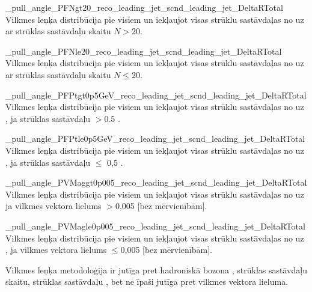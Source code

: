           {_pull_angle_PFNgt20_reco_leading_jet_scnd_leading_jet_DeltaRTotal}
          {Vilkmes leņķa distribūcija pie visiem \DeltaR un iekļaujot visas strūklu sastāvdaļas no \leadingjet uz \scndleadingjet ar strūklas sastāvdaļu skaitu $N>20$.}

          {_pull_angle_PFNle20_reco_leading_jet_scnd_leading_jet_DeltaRTotal}
          {Vilkmes leņķa distribūcija pie visiem \DeltaR un iekļaujot visas strūklu sastāvdaļas no \leadingjet uz \scndleadingjet ar strūklas sastāvdaļu skaitu $N\leq20$.}

          {_pull_angle_PFPtgt0p5GeV_reco_leading_jet_scnd_leading_jet_DeltaRTotal}
          {Vilkmes leņķa distribūcija pie visiem \DeltaR un iekļaujot visas strūklu sastāvdaļas no \leadingjet uz \scndleadingjet, ja strūklas sastāvdaļu \pt$>$0.5 \GeV.}

          {_pull_angle_PFPtle0p5GeV_reco_leading_jet_scnd_leading_jet_DeltaRTotal}
          {Vilkmes leņķa distribūcija pie visiem \DeltaR un iekļaujot visas strūklu sastāvdaļas no \leadingjet uz \scndleadingjet, ja strūklas sastāvdaļu \pt $\leq$ 0,5 \GeV.}

          {_pull_angle_PVMaggt0p005_reco_leading_jet_scnd_leading_jet_DeltaRTotal}
          {Vilkmes leņķa distribūcija pie visiem \DeltaR un iekļaujot visas strūklu sastāvdaļas no \leadingjet uz \scndleadingjet ja vilkmes vektora lielums $> $0,005 [bez mērvienībām].}

          {_pull_angle_PVMagle0p005_reco_leading_jet_scnd_leading_jet_DeltaRTotal}
          {Vilkmes leņķa distribūcija pie visiem \DeltaR un iekļaujot visas strūklu sastāvdaļas no \leadingjet uz \scndleadingjet, ja vilkmes vektora lielums $\leq$0,005 [bez mērvienībām].}

Vilkmes leņķa metodoloģija ir jutīga pret hadroniskā \PW bozona \pt, strūklas sastāvdaļu skaitu, strūklas sastāvdaļu \pt, bet ne īpaši jutīga pret vilkmes vektora lieluma. 


